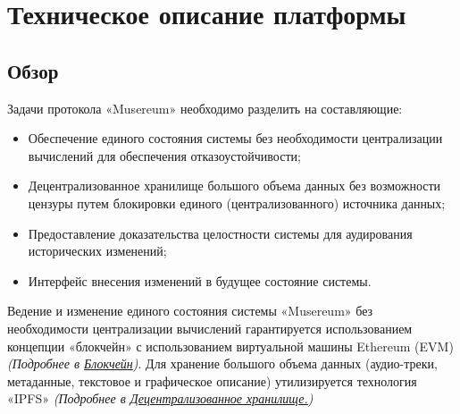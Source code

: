 \documentclass[12pt]{report}
\begin{document}
\chapter{Техническое описание платформы}
\section{Обзор}
\label{tech-review}
\begin{multicols}{2}
Задачи протокола «Musereum» необходимо разделить на составляющие:
\begin{itemize}
\item Обеспечение единого состояния системы без необходимости централизации вычислений для обеспечения отказоустойчивости;
\item Децентрализованное хранилище большого объема данных без возможности цензуры путем блокировки единого (централизованного) источника данных;
\item Предоставление доказательства целостности системы для аудирования исторических изменений;
\item Интерфейс внесения изменений в будущее состояние системы.
\end{itemize}
\vfill\null
\columnbreak
Ведение и изменение единого состояния системы «Musereum» без необходимости централизации вычислений гарантируется использованием концепции «блокчейн» с использованием виртуальной машины Ethereum (EVM) \textit{(Подробнее в \hyperref[tech-blockchain]{Блокчейн})}.
Для хранение большого объема данных (аудио-треки, метаданные, текстовое и графическое описание) утилизируется технология «IPFS» \textit{(Подробнее в \hyperref[tech-storage]{Децентрализованное хранилище.})}
\end{multicols}
\pagebreak
\end{document}
